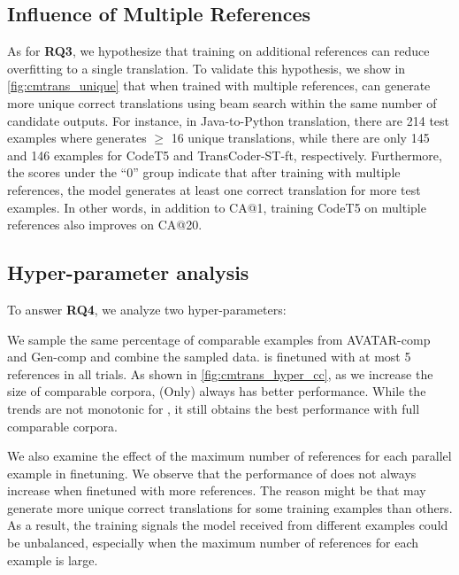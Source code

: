 \subsection{Influence of Multiple References}
As for \textbf{RQ3}, we hypothesize that training on additional references can reduce overfitting to a single translation. 
To validate this hypothesis, we show in \autoref{fig:cmtrans_unique} that when trained with multiple references, \cmtransours can generate more unique correct translations using beam search within the same number of candidate outputs.
For instance, in Java-to-Python translation, there are 214 test examples where \cmtransours generates $\geq$ 16 unique translations, while there are only 145 and 146 examples for CodeT5 and TransCoder-ST-ft, respectively.
Furthermore, the scores under the ``0'' group indicate that after training with multiple references, the model generates at least one correct translation for more test examples.
In other words, in addition to CA@1, training CodeT5 on multiple references also improves on CA@20.

\subsection{Hyper-parameter analysis}
To answer \textbf{RQ4}, we analyze two hyper-parameters: 

We sample the same percentage of comparable examples from AVATAR-comp and Gen-comp and combine the sampled data.
\cmtransours is finetuned with at most 5 references in all trials.
As shown in \autoref{fig:cmtrans_hyper_cc}, as we increase the size of comparable corpora, \cmtransours (\CC Only) always has better performance.
While the trends are not monotonic for \cmtransours, it still obtains the best performance with full comparable corpora.

We also examine the effect of the maximum number of references for each parallel example in finetuning.
We observe that the performance of \cmtransours does not always increase when finetuned with more references.
The reason might be that \cmtransours may generate more unique correct translations for some training examples than others.
As a result, the training signals the model received from different examples could be unbalanced, especially when the maximum number of references for each example is large.


